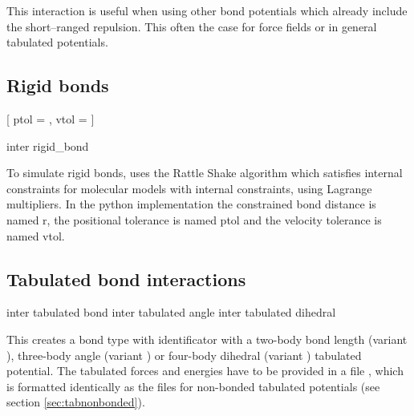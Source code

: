 This interaction is useful when using other bond potentials which already
include the short--ranged repulsion. This often the case for force fields or in
general tabulated potentials.

\subsection{Rigid bonds}
\label{sec:rattle}

\begin{pysyntax}
[
	ptol = ,
	vtol = 
]
\end{pysyntax}

\begin{essyntax}
  inter 
  rigid_bond
    
  \begin{features}
  \end{features}
\end{essyntax}

To simulate rigid bonds, \es uses the Rattle Shake algorithm which
satisfies internal constraints for molecular models with internal
constraints, using Lagrange multipliers.\cite{andersen83a}
In the python implementation the constrained bond distance is named r, the positional tolerance is named ptol and the velocity tolerance is named vtol.

\subsection{Tabulated bond interactions}

\begin{essyntax}
     inter 
    tabulated bond 
     inter 
    tabulated angle 
     inter 
    tabulated dihedral 
\end{essyntax}

This creates a bond type with identificator  with a
two-body bond length (variant ), three-body angle (variant
) or four-body dihedral (variant ) tabulated
potential. The tabulated forces and energies have to be provided in a
file , which is formatted identically as the files for
non-bonded tabulated potentials (see section \ref{sec:tabnonbonded}).

